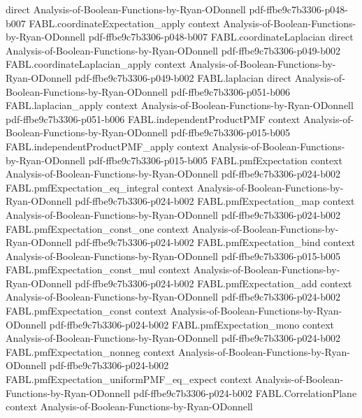 \begin{theorem}
  {direct}
  {Analysis-of-Boolean-Functions-by-Ryan-ODonnell}
  {pdf-ffbe9c7b3306-p048-b007}
\proofstep
  {FABL.coordinateExpectation_apply}
  {context}
  {Analysis-of-Boolean-Functions-by-Ryan-ODonnell}
  {pdf-ffbe9c7b3306-p048-b007}
\proofstep
  {FABL.coordinateLaplacian}
  {direct}
  {Analysis-of-Boolean-Functions-by-Ryan-ODonnell}
  {pdf-ffbe9c7b3306-p049-b002}
\proofstep
  {FABL.coordinateLaplacian_apply}
  {context}
  {Analysis-of-Boolean-Functions-by-Ryan-ODonnell}
  {pdf-ffbe9c7b3306-p049-b002}
\proofstep
  {FABL.laplacian}
  {direct}
  {Analysis-of-Boolean-Functions-by-Ryan-ODonnell}
  {pdf-ffbe9c7b3306-p051-b006}
\proofstep
  {FABL.laplacian_apply}
  {context}
  {Analysis-of-Boolean-Functions-by-Ryan-ODonnell}
  {pdf-ffbe9c7b3306-p051-b006}
\proofstep
  {FABL.independentProductPMF}
  {context}
  {Analysis-of-Boolean-Functions-by-Ryan-ODonnell}
  {pdf-ffbe9c7b3306-p015-b005}
\proofstep
  {FABL.independentProductPMF_apply}
  {context}
  {Analysis-of-Boolean-Functions-by-Ryan-ODonnell}
  {pdf-ffbe9c7b3306-p015-b005}
\proofstep
  {FABL.pmfExpectation}
  {context}
  {Analysis-of-Boolean-Functions-by-Ryan-ODonnell}
  {pdf-ffbe9c7b3306-p024-b002}
\proofstep
  {FABL.pmfExpectation_eq_integral}
  {context}
  {Analysis-of-Boolean-Functions-by-Ryan-ODonnell}
  {pdf-ffbe9c7b3306-p024-b002}
\proofstep
  {FABL.pmfExpectation_map}
  {context}
  {Analysis-of-Boolean-Functions-by-Ryan-ODonnell}
  {pdf-ffbe9c7b3306-p024-b002}
\proofstep
  {FABL.pmfExpectation_const_one}
  {context}
  {Analysis-of-Boolean-Functions-by-Ryan-ODonnell}
  {pdf-ffbe9c7b3306-p024-b002}
\proofstep
  {FABL.pmfExpectation_bind}
  {context}
  {Analysis-of-Boolean-Functions-by-Ryan-ODonnell}
  {pdf-ffbe9c7b3306-p015-b005}
\proofstep
  {FABL.pmfExpectation_const_mul}
  {context}
  {Analysis-of-Boolean-Functions-by-Ryan-ODonnell}
  {pdf-ffbe9c7b3306-p024-b002}
\proofstep
  {FABL.pmfExpectation_add}
  {context}
  {Analysis-of-Boolean-Functions-by-Ryan-ODonnell}
  {pdf-ffbe9c7b3306-p024-b002}
\proofstep
  {FABL.pmfExpectation_const}
  {context}
  {Analysis-of-Boolean-Functions-by-Ryan-ODonnell}
  {pdf-ffbe9c7b3306-p024-b002}
\proofstep
  {FABL.pmfExpectation_mono}
  {context}
  {Analysis-of-Boolean-Functions-by-Ryan-ODonnell}
  {pdf-ffbe9c7b3306-p024-b002}
\proofstep
  {FABL.pmfExpectation_nonneg}
  {context}
  {Analysis-of-Boolean-Functions-by-Ryan-ODonnell}
  {pdf-ffbe9c7b3306-p024-b002}
\proofstep
  {FABL.pmfExpectation_uniformPMF_eq_expect}
  {context}
  {Analysis-of-Boolean-Functions-by-Ryan-ODonnell}
  {pdf-ffbe9c7b3306-p024-b002}
\proofstep
  {FABL.CorrelationPlane}
  {context}
  {Analysis-of-Boolean-Functions-by-Ryan-ODonnell}

\end{theorem}
